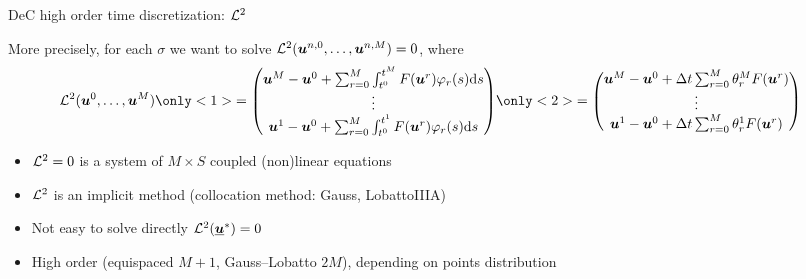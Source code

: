 \documentclass[9pt,compress,t,aspectratio=169]{beamer}
\begin{document}
\begin{frame}{DeC high order time discretization: $\mathcal{L}^2$}
	\begin{minipage}{0.77\textwidth}
		More precisely, for each $\sigma$ we want to solve $\mathcal{L}^2 (\boldsymbol{u}^{n,0},\dots,\boldsymbol{u}^{n,M})=0$, where 
		{\begin{align*}
			\L^2(\bc^0, \dots, \bc^M) &
			\only<1>{=
			\begin{pmatrix}
				\bc^M-\bc^0 +\sum_{r=0}^M \int_{t^0}^{t^M} F(\bc^r) \varphi_r(s) \diff s\\
				\vdots\\
				\bc^1-\bc^0 + \sum_{r=0}^M \int_{t^0}^{t^1} F(\bc^r) \varphi_r(s) \diff s
			\end{pmatrix}
		}
			\only<2>{=
			\begin{pmatrix}
				\bc^M-\bc^0 +\Delta t \sum_{r=0}^M \theta_r^M F(\bc^r) \\
				\vdots\\
				\bc^1-\bc^0 + \Delta t \sum_{r=0}^M  \theta_r^1  F(\bc^r) 
			\end{pmatrix}}
		\end{align*}
	}
		\begin{itemize}
			\item $\mathcal{L}^2=0$ is a system of $M \times S$ coupled (non)linear equations
			\item $\mathcal{L}^2$ is an implicit method (collocation method: Gauss, LobattoIIIA)
			\item Not easy to solve directly $\mathcal{L}^2(\underline{\boldsymbol{u}}^*)=0$
			\item High order (equispaced $M+1$, Gauss--Lobatto $2M$), depending on points distribution
		\end{itemize}
		
	\end{minipage}\hfill
	\begin{minipage}{0.2\textwidth}
		\begin{figure}[h]
			\centering
		\end{figure}
	\end{minipage}
\end{frame}
\end{document}
